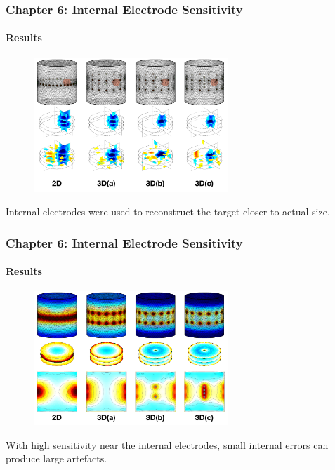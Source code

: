 \documentclass[10pt,    %
    english,            %
    xcolor=table,       %
    envcountsect,        %
    aspectratio=1610
]{beamer}
\begin{document}
\begin{frame}
	\frametitle{Chapter 6: Internal Electrode Sensitivity}
	\framesubtitle{Results}
	\begin{figure}[H]
		\centering
		\includegraphics[width=0.65\textwidth,trim={0 0.5cm 0 0cm},clip]{Image_Comparison.pdf}
	\end{figure}%
	Internal electrodes were used to reconstruct the target closer to actual size.
\end{frame}

\begin{frame}
	\frametitle{Chapter 6: Internal Electrode Sensitivity}
	\framesubtitle{Results}
	\begin{figure}[H]
		\centering
		\includegraphics[width=0.65\textwidth,trim={0 0.5cm 0 0cm},clip]{Sensitivity_Comparison_new.pdf}
	\end{figure}%
	With high sensitivity near the internal electrodes, small internal errors can produce large artefacts.
\end{frame}
\end{document}

